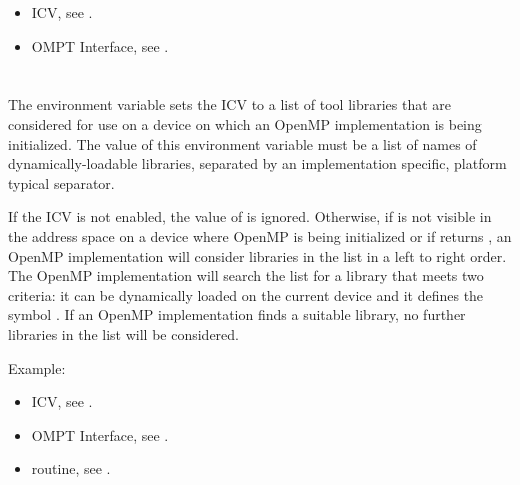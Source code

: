 \crossreferences
\begin{itemize}
\item {} ICV, see .

\item OMPT Interface, see .
\end{itemize}



\section{}
\label{sec:OMP_TOOL_LIBRARIES}

The  environment variable sets the
 ICV to a list of tool libraries that are
considered for use on a device on which an OpenMP implementation
is being initialized. The value of this environment variable must 
be a list of names of dynamically-loadable libraries, separated 
by an implementation specific, platform typical separator.

If the  ICV is not enabled, the value of 
 is ignored. Otherwise, if  
is not visible in the address space on a device where OpenMP is being
initialized or if  returns , an OpenMP 
implementation will consider libraries in the  list
in a left to right order.  The OpenMP implementation will search the list for
a library that meets two criteria: it can be dynamically loaded on the 
current device and it defines the symbol . If an 
OpenMP implementation finds a suitable library, no further libraries in 
the list will be considered.

Example:
\begin{ompEnv}
\end{ompEnv}

\crossreferences
\begin{itemize}
\item {} ICV, see .

\item OMPT Interface, see .

\item {} routine, see .
\end{itemize}



